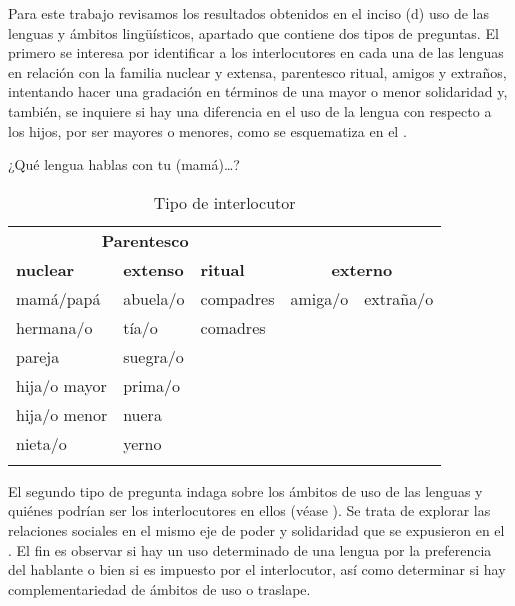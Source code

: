 \documentclass[output=paper]{../langscibook}
\begin{document}
Para este trabajo revisamos los resultados obtenidos en el inciso (d) uso de las lenguas y ámbitos lingüísticos, apartado que contiene dos tipos de preguntas. El primero se interesa por identificar a los interlocutores en cada una de las lenguas en relación con la familia nuclear y extensa, parentesco ritual, amigos y extraños, intentando hacer una gradación en términos de una mayor o menor solidaridad y, también, se inquiere si hay una diferencia en el uso de la lengua con respecto a los hijos, por ser mayores o menores, como se esquematiza en el .

\begin{table}
\caption{\label{tab:guerrero:1} Tipo de interlocutor \citep[305]{GuerreroGalván2016}} 
¿Qué lengua hablas con tu (mamá){\dots}?
\begin{tabular}{lll|lr}
\multicolumn{3}{c}{\textbf{Parentesco}}\\
\textbf{nuclear} & \textbf{extenso}& \textbf{ritual} & \multicolumn{2}{c}{\textbf{externo}}\\
\hline
mamá/papá    &abuela/o  &  compadres  &  amiga/o &  extraña/o\\
hermana/o    &tía/o     &  comadres\\
pareja       &suegra/o&\\
hija/o mayor &prima/o&\\
hija/o menor & nuera& \\
nieta/o      &yerno&\\
\tablevspace
\multicolumn{5}{c}{+\hfill $\longleftarrow$  (solidaridad) $\longrightarrow$ \hfill  -- }\\
\end{tabular}
 
\end{table} 

El segundo tipo de pregunta indaga sobre los ámbitos de uso de las lenguas y quiénes podrían ser los interlocutores en ellos (véase ). Se trata de explorar las relaciones sociales en el mismo eje de poder y solidaridad que se expusieron en el  . El fin es observar si hay un uso determinado de una lengua por la preferencia del hablante o bien si es impuesto por el interlocutor, así como determinar si hay complementariedad de ámbitos de uso o traslape.
\end{document}
